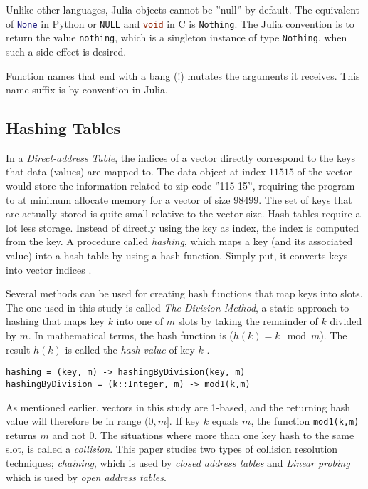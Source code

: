 \documentclass[a4paper, 11pt]{article}
\begin{document}
    Unlike other languages, Julia objects cannot be ''null'' by default. The
    equivalent of \lstinline[language=Python]{None} in Python or
    \lstinline[language=C]{NULL} and \lstinline[language=C]{void} in C is
    \texttt{Nothing}. The Julia convention is to return the value
    \texttt{nothing}, which is a singleton instance of type
    \texttt{Nothing}, when such a side effect is
    desired. 
    
    Function names that end with a bang (!) mutates the arguments it receives. 
    This name suffix is by convention in Julia. 
    \subsection*{Hashing Tables}
    In a \emph{Direct-address Table}, the indices of a vector directly correspond to the keys that
    data (values) are mapped to. 
    The data object at index $11515$ of the vector would store the information 
    related to zip-code ''115 15'', requiring the program to at minimum allocate 
    memory for a vector of size $98499$. The set of keys that are actually stored 
    is quite small relative to the vector size. 
    Hash tables require a lot less storage. Instead of directly using the key as index,
    the index is computed from the key. A procedure called \emph{hashing}, which maps a key 
    (and its associated value) into a hash table by using a hash function. Simply put, it 
    converts keys into vector indices \parencite{Segeqick2011Alg4th}. 
    
    Several methods can be used for creating hash functions that map keys into slots. 
    The one used in this study is called \emph{The Division Method}, 
    a static approach to hashing that maps key $k$ into one of $m$ slots by taking the remainder of 
    $k$ divided by $m$. In mathematical terms, the  hash function is (\(h(k) = k\mod m\)).
    The result $h(k)$ is called the \emph{hash value} of key $k$ \parencite{CormenThomasH2022ItA}.
    
    \begin{verbatim}
hashing = (key, m) -> hashingByDivision(key, m)
hashingByDivision = (k::Integer, m) -> mod1(k,m)
    \end{verbatim}
    
    As mentioned earlier, vectors in this study are 1-based, 
    and the returning hash value will therefore be in range $(0,m]$.
    If key $k$ equals $m$, the function \texttt{mod1(k,m)}
    returns $m$ and not $0$. The situations where more than one key 
    hash to the same slot, is called a \emph{collision}. This paper 
    studies two types of collision resolution techniques; 
    \emph{chaining}, which is used by \emph{closed address tables}
    and \emph{Linear probing} which is used by \emph{open address tables}.
\end{document}
